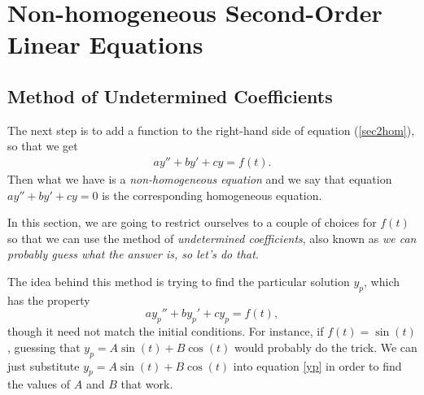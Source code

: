 \documentclass{book}
\begin{document}
\chapter{Non-homogeneous Second-Order Linear Equations}

\section{Method of Undetermined Coefficients}
The next step is to add a function to the right-hand side of equation
(\ref{sec2hom}), so that we get
\begin{align*}
a y'' + b y' + cy =f(t).
\end{align*}
Then what we have is a \emph{non-homogeneous equation} and we say that equation
$a y'' + b y' + cy =0$ is the corresponding homogeneous equation.

In this section, we are going to restrict ourselves to a couple of choices
for $f(t)$ so that we can use the method of \emph{undetermined coefficients},
also known as \emph{we can probably guess what the answer is, so let's do
that}.

The idea behind this method is trying to find the particular solution $y_p$,
which has the property
\begin{dmath}
  \label{yp}
  a y_p'' + b y_p' + cy_p =f(t),
\end{dmath}
though it need not match the initial conditions. For instance, if
$f(t)=\sin(t)$, guessing that $y_p = A \sin(t) + B \cos(t)$ would probably do
the trick. We can just substitute $y_p = A \sin(t) + B \cos(t)$ into equation
\eqref{yp} in order to find the values of $A$ and $B$ that work.
\end{document}
